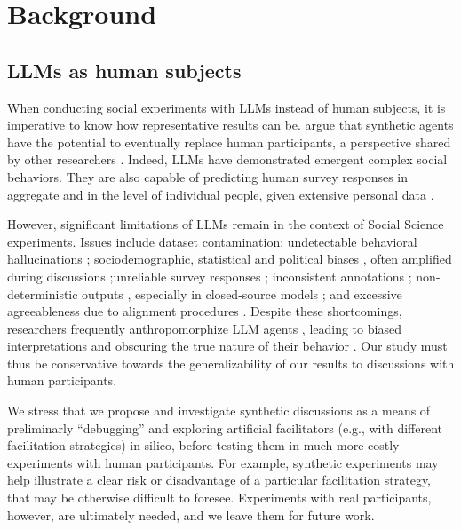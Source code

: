 %
\section{Background}

\subsection{LLMs as human subjects}
\label{ssec:related:human-llm}

When conducting social experiments with \acp{LLM} instead of human subjects, it is imperative to know how representative results can be. \citet{grossman_2023} argue that synthetic agents have the potential to eventually replace human participants, a perspective shared by other researchers \cite{tornberg_2023, argyle2023}. Indeed, \acp{LLM} have demonstrated emergent complex social behaviors\cite{Park2023GenerativeAI, demarzo_2023, leng_2024, abdelnabi_negotiations, abramski_2023}. They are also capable of predicting human survey responses in aggregate \cite{hewitt2024predicting} and in the level of individual people, given extensive personal data \cite{park2024generativeagentsimulations1000}. %

However, significant limitations of \acp{LLM} remain in the context of Social Science experiments. Issues include dataset contamination; undetectable behavioral hallucinations \cite{rossi_2024}; sociodemographic, statistical and political biases \cite{anthis_2025,hewitt2024predicting,rossi_2024}, often amplified during discussions \cite{Taubenfeld2024SystematicBI};unreliable survey responses \cite{jansen_2023,bisbee_2023,neumann_2025}; inconsistent annotations \cite{Gligoric2024CanUL}; non-deterministic outputs \cite{atil_2025}, especially in closed-source models \cite{bisbee_2023}; and excessive agreeableness due to alignment procedures \cite{Park2023GenerativeAI, anthis_2025, rossi_2024}. Despite these shortcomings, researchers frequently anthropomorphize \ac{LLM} agents \cite{rossi_2024}, leading to biased interpretations and obscuring the true nature of their behavior \cite{anthis_2025,zhou-etal-2024-real}. Our study must thus be conservative towards the generalizability of our results to discussions with human participants.

We stress that we propose and investigate synthetic discussions as a means of preliminarly “debugging” and exploring artificial facilitators (e.g., with different facilitation strategies) in silico, before testing them in much more costly experiments with human participants. For example, synthetic experiments may help illustrate a clear risk or disadvantage of a particular facilitation strategy, that may be otherwise difficult to foresee. Experiments with real participants, however, are ultimately needed, and we leave them for future work.


